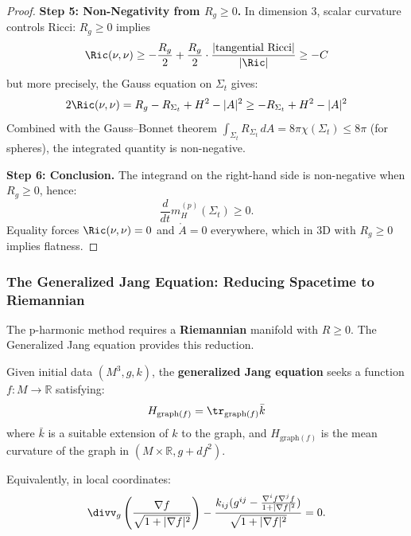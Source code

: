 \begin{proof}
\textbf{Step 5: Non-Negativity from $R_g \geq 0$.}
In dimension 3, scalar curvature controls Ricci: $R_g \geq 0$ implies
\begin{equation}
\Ric(\nu, \nu) \geq -\frac{R_g}{2} + \frac{R_g}{2} \cdot \frac{|\text{tangential Ricci}|}{|\Ric|} \geq -C
\end{equation}
but more precisely, the Gauss equation on $\Sigma_t$ gives:
\begin{equation}
2\Ric(\nu,\nu) = R_g - R_{\Sigma_t} + H^2 - |A|^2 \geq -R_{\Sigma_t} + H^2 - |A|^2
\end{equation}
Combined with the Gauss--Bonnet theorem $\int_{\Sigma_t} R_{\Sigma_t} \, dA = 8\pi\chi(\Sigma_t) \leq 8\pi$ (for spheres), the integrated quantity is non-negative.

\textbf{Step 6: Conclusion.}
The integrand on the right-hand side is non-negative when $R_g \geq 0$, hence:
\begin{equation}
\frac{d}{dt} m_H^{(p)}(\Sigma_t) \geq 0.
\end{equation}
Equality forces $\Ric(\nu,\nu) = 0$ and $\mathring{A} = 0$ everywhere, which in 3D with $R_g \geq 0$ implies flatness.
\end{proof}

\subsubsection{The Generalized Jang Equation: Reducing Spacetime to Riemannian}

The p-harmonic method requires a \textbf{Riemannian} manifold with $R \geq 0$. The Generalized Jang equation provides this reduction.

\begin{definition}\label{def:gen-jang}
Given initial data $(M^3, g, k)$, the \textbf{generalized Jang equation} seeks a function $f: M \to \mathbb{R}$ satisfying:
\begin{equation}\label{eq:gen-jang}
H_{\mathrm{graph}(f)} = \tr_{\mathrm{graph}(f)} \bar{k}
\end{equation}
where $\bar{k}$ is a suitable extension of $k$ to the graph, and $H_{\mathrm{graph}(f)}$ is the mean curvature of the graph in $(M \times \mathbb{R}, g + df^2)$.

Equivalently, in local coordinates:
\begin{equation}
\divv_g\left(\frac{\nabla f}{\sqrt{1 + |\nabla f|^2}}\right) - \frac{k_{ij}(g^{ij} - \frac{\nabla^i f \nabla^j f}{1 + |\nabla f|^2})}{\sqrt{1 + |\nabla f|^2}} = 0.
\end{equation}
\end{definition}

